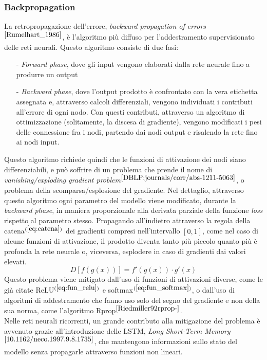 \subsubsection{Backpropagation} La retropropagazione dell'errore, \textit{backward propagation of errors}$^{\cite{Rumelhart_1986}}$, è l'algoritmo più diffuso per l'addestramento supervisionato delle reti neurali. Questo algoritmo consiste di due fasi:
\begin{itemize}
    \item[-] \textit{Forward phase}, dove gli input vengono elaborati dalla rete neurale fino a produrre un output
    \item[-] \textit{Backward phase}, dove l'output prodotto è confrontato con la vera etichetta assegnata e, attraverso calcoli differenziali, vengono individuati i contributi all'errore di ogni nodo. Con questi contributi, attraverso un algoritmo di ottimizzazione (solitamente, la discesa di gradiente), vengono modificati i pesi delle connessione fra i nodi, partendo dai nodi output e risalendo la rete fino ai nodi input.
\end{itemize}
Questo algoritmo richiede quindi che le funzioni di attivazione dei nodi siano differenziabili, e può soffrire di un problema che prende il nome di \textit{vanishing/exploding gradient problem}$^{\cite{DBLP:journals/corr/abs-1211-5063}}$, o problema della scomparsa/esplosione del gradiente. Nel dettaglio, attraverso questo algoritmo ogni parametro del modello viene modificato, durante la \textit{backward phase}, in maniera proporzionale alla derivata parziale della funzione \textit{loss} rispetto al parametro stesso. Propagando all'indietro attraverso la regola della catena$^{(\ref{eq:catena})}$ dei gradienti compresi nell'intervallo $[0, 1]$, come nel caso di alcune funzioni di attivazione, il prodotto diventa tanto più piccolo quanto più è profonda la rete neurale o, viceversa, esplodere in caso di gradienti dai valori elevati.
\begin{equation}\label{eq:catena}
D\left[f(g(x))\right] = f'(g(x))\cdot g'(x)
\end{equation}
Questo problema viene mitigato dall'uso di funzioni di attivazioni diverse, come le già citate ReLU$^{(\ref{eq:fun_relu})}$ e softmax$^{(\ref{eq:fun_softmax})}$, o dall'uso di algoritmi di addestramento che fanno uso solo del segno del gradiente e non della sua norma, come l'algoritmo Rprop$^{\cite{Riedmiller92rprop-}}$.\\
Nelle reti neurali ricorrenti, un grande contributo alla mitigazione del problema è avvenuto grazie all'introduzione delle LSTM, \textit{Long Short-Term Memory}$^{\cite{10.1162/neco.1997.9.8.1735}}$, che mantengono informazioni sullo stato del modello senza propagarle attraverso funzioni non lineari.


